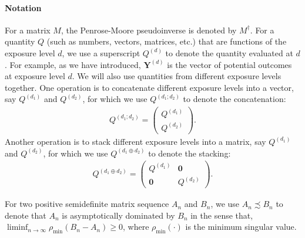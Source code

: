 \documentclass{article}
\theoremstyle{plain}
\theoremstyle{definition}
\theoremstyle{remark}
\newcommand{\bY}{\boldsymbol{Y}}
\newcommand{\bZero}{\boldsymbol{0}}
\begin{document}
\paragraph{Notation} 
For a matrix $M$, the Penrose-Moore pseudoinverse is denoted by $M^{\dagger}$. For a quantity $Q$ (such as numbers, vectors, matrices, etc.) that are functions of the exposure level $d$, we use a superscript $Q^{(d)}$ to denote the quantity evaluated at $d$. For example, as we have introduced, $\bY^{(d)}$ is the vector of potential outcomes at exposure level $d$. We will also use  quantities from different exposure levels together. One operation is to concatenate different exposure levels into a vector, say $Q^{(d_1)}$ and $Q^{(d_2)}$, for which we use $Q^{(d_1;d_2)}$ to denote the concatenation:
\begin{align*}
    Q^{(d_1;d_2)} = 
    \begin{pmatrix}
        Q^{(d_1)} \\
        Q^{(d_2)}
    \end{pmatrix}.
\end{align*}
Another operation is to stack different exposure levels into a matrix, say $Q^{(d_1)}$ and $Q^{(d_2)}$, for which we use $Q^{(d_1\oplus d_2)}$ to denote the stacking:
\begin{align*}
    Q^{(d_1\oplus d_2)} = 
    \begin{pmatrix}
        Q^{(d_1)} & \bZero \\
        \bZero & Q^{(d_2)}
    \end{pmatrix}.
\end{align*}

For two positive semidefinite matrix sequence $A_n$ and $B_n$, we use $A_n\precsim B_n$ to denote that $A_n$ is asymptotically dominated by $B_n$ in the sense that, $\liminf_{n\to\infty} \rho_{\min}(B_n - A_n) \ge 0$, where $\rho_{\min}(\cdot)$ is the minimum singular value.
\end{document}
